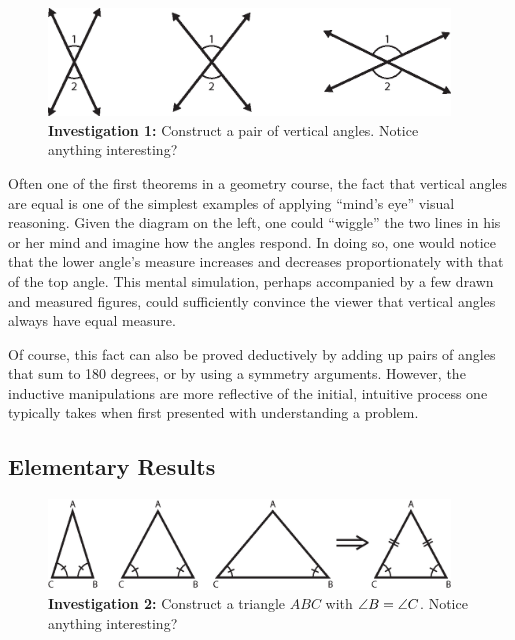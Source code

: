 \begin{figure}[h!]
\centering
\includegraphics[width=0.95\textwidth]{diagrams/vertical.eps}
\captionsetup{labelformat=empty}
\caption{{\bf Investigation 1:} Construct a pair of vertical angles.
  Notice anything interesting?}
\end{figure}

Often one of the first theorems in a geometry course, the fact that
vertical angles are equal is one of the simplest examples of applying
``mind's eye'' visual reasoning.  Given the diagram on the left, one
could ``wiggle'' the two lines in his or her mind and imagine how the
angles respond.  In doing so, one would notice that the lower angle's
measure increases and decreases proportionately with that of the top
angle.  This mental simulation, perhaps accompanied by a few drawn and
measured figures, could sufficiently convince the viewer that vertical
angles always have equal measure.

Of course, this fact can also be proved deductively by adding up pairs
of angles that sum to 180 degrees, or by using a symmetry arguments.
However, the inductive manipulations are more reflective of the
initial, intuitive process one typically takes when first presented
with understanding a problem.

\newpage
\subsection{Elementary Results}
\label{sec:elem}

\begin{figure}[h!]
\centering
\includegraphics[width=0.95\textwidth]{diagrams/isoceles-triangle.eps}
\captionsetup{labelformat=empty}
\caption{{\bf Investigation 2:} Construct a triangle $ABC$ with
$ \protect\angle B = \protect\angle C$. Notice anything interesting?}
\end{figure}

